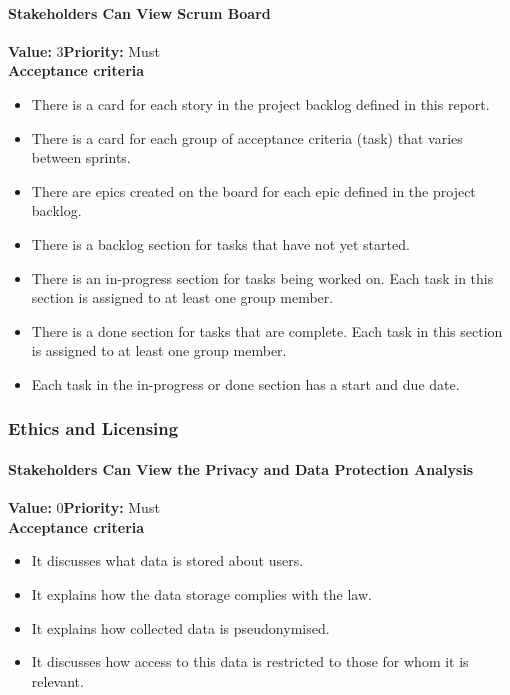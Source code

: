 \paragraph{Stakeholders Can View Scrum Board}
\textbf{Value:} 3\quad \textbf{Priority:} Must\\
\textbf{Acceptance criteria}
\begin{itemize}
  \item There is a card for each story in the project backlog defined in this report.
  \item There is a card for each group of acceptance criteria (task) that varies between sprints.
  \item There are epics created on the board for each epic defined in the project backlog.
  \item There is a backlog section for tasks that have not yet started.
  \item There is an in-progress section for tasks being worked on. Each task in this section is assigned to at least one group member.
  \item There is a done section for tasks that are complete. Each task in this section is assigned to at least one group member.
  \item Each task in the in-progress or done section has a start and due date.
\end{itemize}

\subsubsection{Ethics and Licensing}

\paragraph{Stakeholders Can View the Privacy and Data Protection Analysis}
\textbf{Value:} 0\quad \textbf{Priority:} Must\\
\textbf{Acceptance criteria}
\begin{itemize}
  \item It discusses what data is stored about users.
  \item It explains how the data storage complies with the law.
  \item It explains how collected data is pseudonymised.
  \item It discusses how access to this data is restricted to those for whom it is relevant.
\end{itemize}

